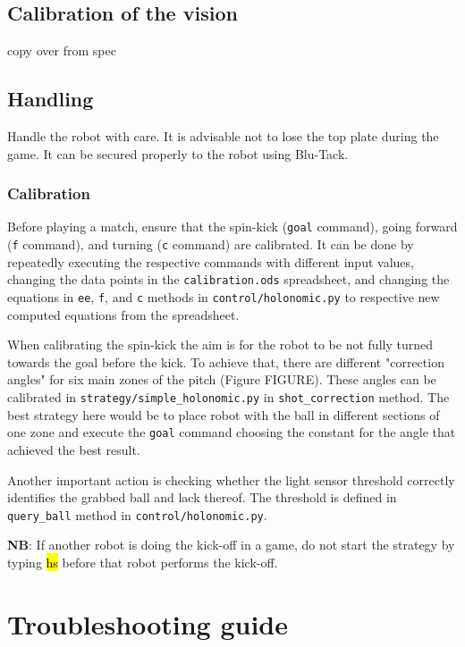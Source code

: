 \documentclass[a4paper,12pt]{article}
\newcommand{\hg}[1]{\hl{\ttfamily #1}}
\begin{document}
\subsection{Calibration of the vision} \label{calibration}

copy over from spec

\subsection{Handling} \label{handling}

Handle the robot with care. It is advisable not to lose the top plate during the game. It can be secured properly to the robot using Blu-Tack. 

\subsubsection{Calibration}
Before playing a match, ensure that the spin-kick (\texttt{goal} command), going forward (\texttt{f} command), and turning (\texttt{c} command) are calibrated. It can be done by repeatedly executing the respective commands with different input values, changing the data points in the \texttt{calibration.ods} spreadsheet, and changing the equations in \texttt{ee}, \texttt{f}, and \texttt{c} methods in \texttt{control/holonomic.py} to respective new computed equations from the spreadsheet. 

When calibrating the spin-kick the aim is for the robot to be not fully turned towards the goal before the kick. To achieve that, there are different "correction angles" for six main zones of the pitch (Figure FIGURE). These angles can be calibrated in \texttt{strategy/simple\_holonomic.py} in \texttt{shot\_correction} method. The best strategy here would be to place robot with the ball in different sections of one zone and execute the \texttt{goal} command choosing the constant for the angle that achieved the best result.

Another important action is checking whether the light sensor threshold correctly identifies the grabbed ball and lack thereof. The threshold is defined in \texttt{query\_ball} method in \texttt{control/holonomic.py}.

\textbf{NB}: If another robot is doing the kick-off in a game, do not start the strategy by typing \hg{hs} before that robot performs the kick-off.

\section{Troubleshooting guide}
\end{document}

